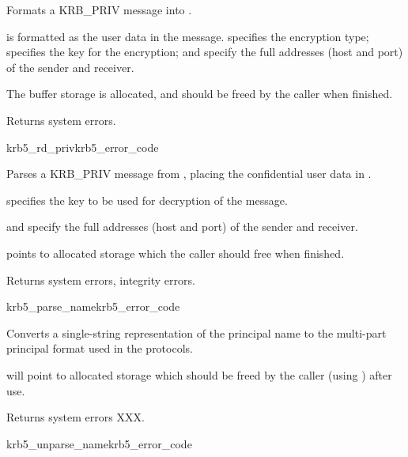 Formats a KRB_PRIV message into .

 is formatted as the user data in the message.
 specifies the encryption type; 
specifies the key for the encryption;  and
 specify the full addresses (host and port) of the
sender and receiver.

The  buffer storage is allocated, and should be freed by the
caller when finished.

Returns system errors.

\begin{funcdecl}{krb5_rd_priv}{krb5_error_code}{\funcin}
\funcout
{}
\end{funcdecl}

Parses a KRB_PRIV message from , placing the confidential user
data in .

 specifies the key to be used for decryption of the message.
 
 and  specify the full
addresses (host and port) of the sender and receiver.

 points to allocated storage which the caller should
free when finished.

Returns system errors, integrity errors.

\begin{funcdecl}{krb5_parse_name}{krb5_error_code}{\funcin}
\funcout
{}
\end{funcdecl}

Converts a single-string representation  of the
principal name to the multi-part principal format used in the protocols.

 will point to allocated storage which should be freed by
the caller (using ) after use.

Returns system errors XXX.

\begin{funcdecl}{krb5_unparse_name}{krb5_error_code}{\funcin}
\funcout
{}
\end{funcdecl}


